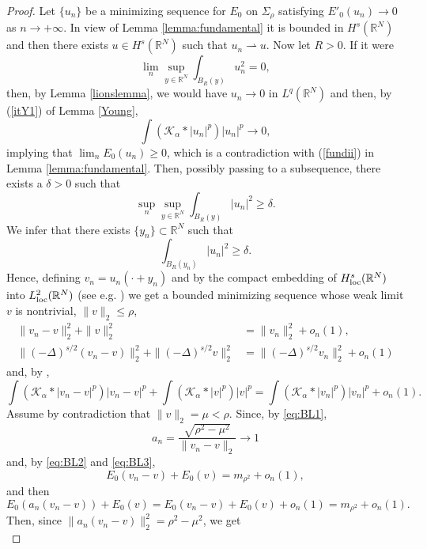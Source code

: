 \documentclass[10pt]{amsart}
\numberwithin{equation}{section}
\begin{document}
\begin{proof}
Let $\{u_n\}$ be a minimizing sequence for $E_0$ on $\Sigma_{\rho}$ satisfying $E'_0(u_n)\to 0$ as $n\to+\infty$. In view of Lemma \ref{lemma:fundamental} it is bounded in $H^s(\mathbb{R}^N)$ and then there exists $u\in H^s(\mathbb{R}^N)$ such that $u_n \rightharpoonup u$.
Now let $R>0$. If it were
\[
\lim_n \sup_{y\in\mathbb{R}^N} \int_{B_R(y)} u_{n}^2 =0,
\]
then, by Lemma \ref{lionslemma}, we would have
$u_{n} \to 0$ in $L^q(\mathbb{R}^N)$ and then, by (\ref{itY1}) of Lemma \ref{Young},
\begin{equation*}\label{eq:ovvia}
\int ( \mathcal K_{\alpha}*|u_{n}|^{p}) |u_{n}|^{p} \to 0,
\end{equation*}
implying that $\lim_{n}E_0(u_{n})\geq0$, which is a contradiction with (\ref{fundii}) in Lemma \ref{lemma:fundamental}.
Then, possibly passing to a subsequence, there exists a $\delta>0$ such that
\begin{equation*} 
\sup_{n}\sup_{y\in \mathbb R^{N}}\int_{B_R(y)}|u_{n}|^{2}\geq \delta.
\end{equation*}
We infer that there exists $\{y_{n}\}\subset \mathbb R^{N}$ such that
\[
\int_{B_R(y_{n})}|u_{n}|^{2}\geq\delta.
\]
Hence, defining $v_n = u_n(\cdot + y_n)$ and by  the compact embedding of $H^s_{\rm loc}(\mathbb{R}^N)$ into $L^2_{\rm loc}(\mathbb{R}^N)$ (see e.g. \cite[Corollary 7.2]{DPV})
we get a bounded minimizing sequence whose weak limit $v$ is nontrivial, $\| v \|_2 \leq \rho$,
\begin{align}
\label{eq:BL1}
\| v_n - v \|_2^2 + \| v \|_2^2 
& = 
\| v_n \|_2^2 + o_n(1),\\
\label{eq:BL2}
\| (-\Delta)^{s/2} (v_n - v) \|_2^2 + \| (-\Delta)^{s/2} v \|_2^2 
& = 
\| (-\Delta)^{s/2} v_n \|_2^2 + o_n(1)
\end{align}
and, by \cite[Lemma 2.4]{MV}, 
\begin{equation}
\label{eq:BL3}
\int(\mathcal{K}_\alpha * |v_{n} - v |^p)|v_{n} - v|^p 
+ \int(\mathcal{K}_\alpha * |v |^p)|v|^p
=
\int(\mathcal{K}_\alpha * |v_{n}|^p)|v_{n}|^p + o_n(1).
\end{equation}
Assume by contradiction that $\| v \|_2 = \mu < \rho$.
Since, by \eqref{eq:BL1},
\[
a_n= \frac{\sqrt{\rho^2 - \mu^2}}{\| v_n - v \|_2} \to 1
\]
and, by \eqref{eq:BL2} and \eqref{eq:BL3},
\[
E_0(v_n - v) + E_0(v) = m_{\rho^2} + o_n(1),
\]
and then
\[
E_0(a_n(v_n - v)) + E_0(v) 
= E_0(v_n - v) + E_0(v) + o_n(1) 
= m_{\rho^2} + o_n(1).
\]
Then, since $\| a_n(v_n - v) \|_2^2= \rho^2 - \mu^2$, we get
\begin{equation}

\end{equation}
\end{proof}
\end{document}
